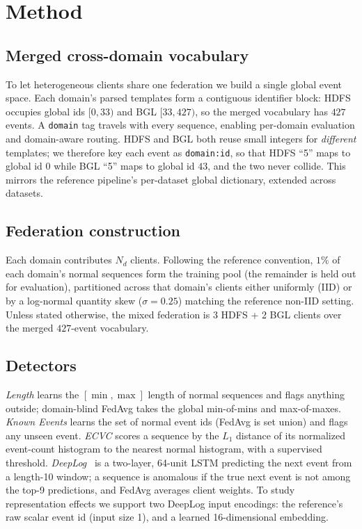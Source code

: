 \documentclass[journal]{IEEEtran}
\begin{document}
\section{Method}

\subsection{Merged cross-domain vocabulary}
To let heterogeneous clients share one federation we build a single global event space. Each
domain's parsed templates form a contiguous identifier block: HDFS occupies global ids $[0,33)$ and
BGL $[33,427)$, so the merged vocabulary has $427$ events. A \texttt{domain} tag travels with every
sequence, enabling per-domain evaluation and domain-aware routing. HDFS and BGL both reuse small
integers for \emph{different} templates; we therefore key each event as
\texttt{domain:id}, so that HDFS ``5'' maps to global id $0$ while BGL ``5'' maps to global id
$43$, and the two never collide. This mirrors the reference pipeline's per-dataset global dictionary,
extended across datasets.

\subsection{Federation construction}
Each domain contributes $N_d$ clients. Following the reference convention, $1\%$ of each domain's
normal sequences form the training pool (the remainder is held out for evaluation), partitioned
across that domain's clients either uniformly (IID) or by a log-normal quantity skew
($\sigma=0.25$) matching the reference non-IID setting. Unless stated otherwise, the mixed
federation is 3 HDFS + 2 BGL clients over the merged $427$-event vocabulary.

\subsection{Detectors}
\emph{Length} learns the $[\min,\max]$ length of normal sequences and flags anything outside;
domain-blind FedAvg takes the global min-of-mins and max-of-maxes. \emph{Known Events} learns the
set of normal event ids (FedAvg is set union) and flags any unseen event. \emph{ECVC} scores a
sequence by the $L_1$ distance of its normalized event-count histogram to the nearest normal
histogram, with a supervised threshold. \emph{DeepLog}~\cite{du2017deeplog} is a two-layer,
64-unit LSTM predicting the next event from a length-10 window; a sequence is anomalous if the true
next event is not among the top-9 predictions, and FedAvg averages client weights. To study
representation effects we support two DeepLog input encodings: the reference's raw scalar event id
(input size 1), and a learned 16-dimensional embedding.
\end{document}
